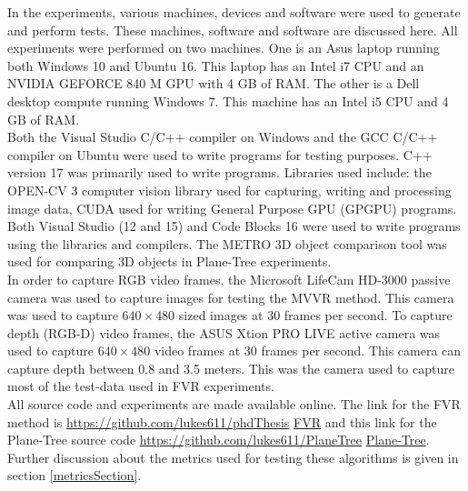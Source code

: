 
In the experiments, various machines, devices and software were used to generate and perform tests. These machines, software and software are discussed here. All experiments were performed on two machines. One is an Asus laptop running both Windows 10 and Ubuntu 16. This laptop has an Intel i7 CPU and an NVIDIA GEFORCE 840 M GPU with 4 GB of RAM. The other is a Dell desktop compute running Windows 7. This machine has an Intel i5 CPU and 4 GB of RAM. \\ 

Both the Visual Studio C/C++ compiler on Windows and the GCC C/C++ compiler on Ubuntu were used to write programs for testing purposes. C++ version 17 was primarily used to write programs. Libraries used include: the OPEN-CV 3 computer vision library used for capturing, writing and processing image data, CUDA used for writing General Purpose GPU (GPGPU) programs. Both Visual Studio (12 and 15) and Code Blocks 16 were used to write programs using the libraries and compilers. The METRO 3D object comparison tool was used for comparing 3D objects in Plane-Tree experiments. \\

In order to capture RGB video frames, the Microsoft LifeCam HD-3000 passive camera was used to capture images for testing the MVVR method. This camera was used to capture  $640 \times 480$ sized images at 30 frames per second. To capture depth (RGB-D) video frames, the ASUS Xtion PRO LIVE active camera was used to capture $640 \times 480$ video frames at 30 frames per second. This camera can capture depth between 0.8 and 3.5 meters. This was the camera used to capture most of the test-data used in FVR experiments. \\ 

All source code and experiments are made available online. The link for the FVR method is \url{https://github.com/lukes611/phdThesis} \href{https://github.com/lukes611/phdThesis} {FVR} and this link for the Plane-Tree source code \url{https://github.com/lukes611/PlaneTree} \href{https://github.com/lukes611/PlaneTree}{Plane-Tree}. Further discussion about the metrics used for testing these algorithms is given in section \ref{metricsSection}. \\  
